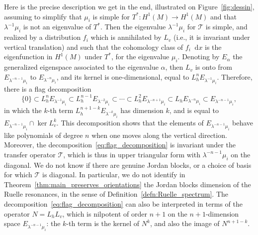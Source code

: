 \documentclass[11pt, a4paper, oneside, final, pagebackref]{amsart}
\newcommand{\boT}{\mathcal{T}}
\newcommand{\dd}{\mathop{}\!\mathrm{d}}
\theoremstyle{definition}
\numberwithin{equation}{section}
\begin{document}
Here is the precise description we get in the end, illustrated on Figure~\ref{fig:dessin}, assuming to simplify that
$\mu_i$ is simple for $T^* : H^1(M) \to H^1(M)$ and that $\lambda^{-1}\mu_i$
is not an eigenvalue of $T^*$. Then the eigenvalue $\lambda^{-1} \mu_i$ for
$\boT$ is simple, and realized by a distribution $f_i$ which is annihilated
by $L_v$ (i.e., it is invariant under vertical translation) and such that the
cohomology class of $f_i \dd x$ is the eigenfunction in $H^1(M)$ under $T^*$,
for the eigenvalue $\mu_i$. Denoting by $E_\alpha$ the generalized eigenspace
associated to the eigenvalue $\alpha$, then $L_v$ is onto from
$E_{\lambda^{-n-1} \mu_i}$ to $E_{\lambda^{-n} \mu_i}$, and its kernel is
one-dimensional, equal to $L_h^n E_{\lambda^{-1}\mu_i}$. Therefore, there is
a flag decomposition
\begin{equation}
\label{eq:flag_decomposition}
  \{0\} \subset L_h^n E_{\lambda^{-1}\mu_i} \subset L_h^{n-1} E_{\lambda^{-2}\mu_i}
  \subset \dotsb \subset L_h^2 E_{\lambda^{-n+1} \mu_i} \subset L_h E_{\lambda^{-n} \mu_i}
  \subset E_{\lambda^{-n-1}\mu_i},
\end{equation}
in which the $k$-th term $L_h^{n+1-k} E_{\lambda^{-k} \mu_i}$ has dimension
$k$, and is equal to $E_{\lambda^{-n-1}\mu_i} \cap \ker L_v^k$. This
decomposition shows that the elements of $E_{\lambda^{-n-1}\mu_i}$ behave
like polynomials of degree $n$ when one moves along the vertical direction.
Moreover, the decomposition~\eqref{eq:flag_decomposition} is invariant under
the transfer operator $\boT$, which is thus in upper triangular form with
$\lambda^{-n-1}\mu_i$ on the diagonal. We do not know if there are genuine
Jordan blocks, or a choice of basis for which $\boT$ is diagonal. In
particular, we do not identify in
Theorem~\ref{thm:main_preserves_orientations} the Jordan blocks dimension of
the Ruelle resonances, in the sense of Definition~\ref{defn:Ruelle_spectrum}.
The decomposition~\eqref{eq:flag_decomposition} can also be interpreted in
terms of the operator $N = L_h L_v$, which is nilpotent of order $n+1$ on the
$n+1$-dimension space $E_{\lambda^{-n-1} \mu_i}$: the $k$-th term is the
kernel of $N^k$, and also the image of $N^{n+1-k}$.
%
\end{document}
